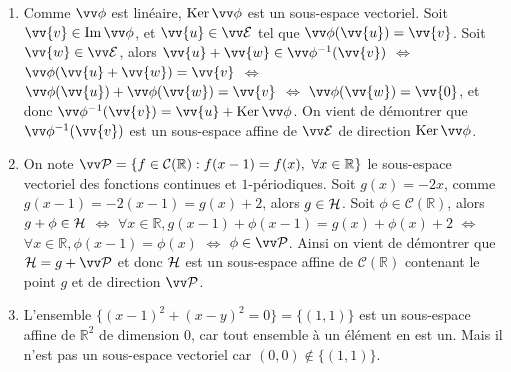 \documentclass[a4paper,12pt,reqno]{amsart}
\begin{document}
\begin{solution}

  \begin{enumerate}
    \item Comme $\vv\phi$ est linéaire, $\ker{\vv\phi}$ est un sous-espace vectoriel. Soit $\vv{v}\in\im\vv\phi$, et $\vv{u}\in\ev{E}$ tel que $\vv\phi(\vv{u})=\vv{v}$. Soit $\vv{w} \in \ev{E}$, alors $\vv{u}+\vv{w} \in \vv\phi^{-1}(\vv{v})$ $\Leftrightarrow$ $\vv\phi(\vv{u}+\vv{w})=\vv{v}$ $\Leftrightarrow$ $\vv\phi(\vv{u})+\vv\phi(\vv{w})=\vv{v}$ $\Leftrightarrow$ $\vv\phi(\vv{w})=\vv{0}$, et donc $\vv\phi^{-1}(\vv{v}) = \vv{u} + \ker{\vv\phi}$. On vient de démontrer que $\vv\phi^{-1}(\vv{v})$ est un sous-espace affine de $\ev{E}$ de direction $\ker{\vv\phi}$.
    \item On note $\ev{P} = \{ f \in \mathcal{C}(\mathbb{R}) : f(x-1)=f(x), \ \forall x \in \mathbb{R} \}$ le sous-espace vectoriel des fonctions continues et $1$-périodiques. Soit $g(x)=-2x$, comme $g(x-1)=-2(x-1)=g(x)+2$, alors $g\in\mathcal{H}$. Soit $\phi \in \mathcal{C}(\mathbb{R})$, alors $g+\phi \in \mathcal{H}$ $\Leftrightarrow$ $\forall x \in \mathbb{R}, g(x-1)+\phi(x-1)=g(x)+\phi(x)+2$ $\Leftrightarrow$ $\forall x \in \mathbb{R}, \phi(x-1)=\phi(x)$ $\Leftrightarrow$ $\phi \in \ev{P}$. Ainsi on vient de démontrer que $\ens{H}=g+\ev{P}$ et donc $\mathcal{H}$ est un sous-espace affine de $\mathcal{C}(\mathbb{R})$ contenant le point $g$ et de direction $\ev{P}$.
    \item L'ensemble $\{(x-1)^{2}+(x-y)^{2}=0\}=\{(1,1)\}$ est un sous-espace affine de $\mathbb{R}^{2}$ de dimension $0$, car tout ensemble à un élément en est un. Mais il n'est pas un sous-espace vectoriel car $(0,0) \notin \{(1,1)\}$.
  \end{enumerate}
\end{solution}
\end{document}
